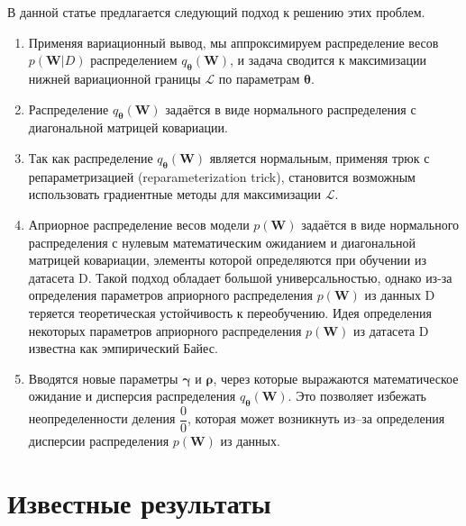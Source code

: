 \documentclass{article}
\numberwithin{equation}{section}
\begin{document}
    В данной статье предлагается следующий подход к решению этих проблем.

    \begin{enumerate}
        \item Применяя вариационный вывод,
            мы аппроксимируем распределение весов $p(\pmb{W}| D)$
            распределением $q_{\pmb{\theta}}(\pmb{W})$,
            и задача сводится к максимизации нижней вариационной границы
            $\mathcal{L}$ по параметрам $\pmb{\theta}$.
        \item Распределение $q_{\pmb{\theta}}(\pmb{W})$
            задаётся в виде нормального распределения с диагональной матрицей ковариации.
        \item Так как распределение $q_{\pmb{\theta}}(\pmb{W})$
            является нормальным, применяя трюк с репараметризацией
            (reparameterization trick),
            становится возможным использовать градиентные методы
            для максимизации $\mathcal{L}$.
        \item Априорное распределение весов модели $p(\pmb{W})$
            задаётся в виде нормального распределения с нулевым математическим ожиданием
            и диагональной матрицей ковариации,
            элементы которой определяются при обучении из датасета D.
            Такой подход обладает большой универсальностью,
            однако из-за определения параметров априорного распределения $p(\pmb{W})$
            из данных D теряется теоретическая устойчивость к переобучению.
            Идея определения некоторых параметров априорного распределения
            $p(\pmb{W})$ из датасета D
            известна как эмпирический Байес.
        \item Вводятся новые параметры $\pmb{\gamma}$ и $\pmb{\rho}$,
            через которые выражаются математическое ожидание и дисперсия распределения
            $q_{\pmb{\theta}}(\pmb{W})$.
            Это позволяет избежать неопределенности деления $\dfrac{0}{0}$,
            которая может возникнуть из--за определения дисперсии распределения $p(\pmb{W})$ из данных.
    \end{enumerate}

    \section{Известные результаты}
\end{document}
